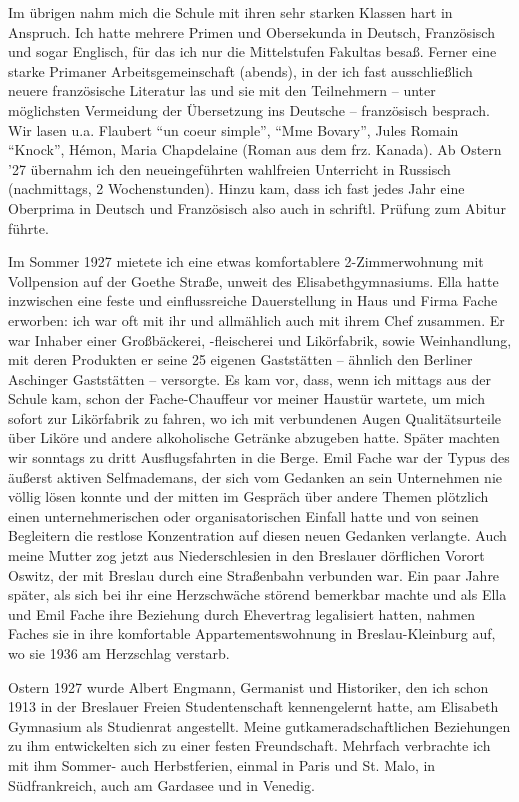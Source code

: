 Im übrigen nahm mich die Schule mit ihren sehr starken Klassen hart in Anspruch. Ich hatte mehrere Primen und Obersekunda in Deutsch, Französisch und sogar Englisch, für das ich nur die Mittelstufen Fakultas besaß. Ferner eine starke Primaner Arbeitsgemeinschaft (abends), in der ich fast ausschließlich neuere französische Literatur las und sie mit den Teilnehmern -- unter möglichsten Vermeidung der Übersetzung ins Deutsche -- französisch besprach. Wir lasen u.a. Flaubert \enquote{un coeur simple}, \enquote{Mme Bovary}, Jules Romain \enquote{Knock}, Hémon, Maria Chapdelaine (Roman aus dem frz. Kanada). Ab Ostern '27 übernahm ich den neueingeführten wahlfreien Unterricht in Russisch (nachmittags, 2 Wochenstunden). Hinzu kam, dass ich fast jedes Jahr eine Oberprima in Deutsch und Französisch also auch in schriftl. Prüfung zum Abitur führte.

Im Sommer 1927 mietete ich eine etwas komfortablere 2-Zimmerwohnung mit Vollpension auf der Goethe Straße, unweit des Elisabethgymnasiums. Ella hatte inzwischen eine feste und einflussreiche Dauerstellung in Haus und Firma Fache erworben: ich war oft mit ihr und allmählich auch mit ihrem Chef zusammen. Er war Inhaber einer Großbäckerei, -fleischerei und Likörfabrik, sowie Weinhandlung, mit deren Produkten er seine 25 eigenen Gaststätten -- ähnlich den Berliner Aschinger Gaststätten -- versorgte. Es kam vor, dass, wenn ich mittags aus der Schule kam, schon der Fache-Chauffeur vor meiner Haustür wartete, um mich sofort zur Likörfabrik zu fahren, wo ich mit verbundenen Augen Qualitätsurteile über Liköre und andere alkoholische Getränke abzugeben hatte. Später machten wir sonntags zu dritt Ausflugsfahrten in die Berge. Emil Fache war der Typus des äußerst aktiven Selfmademans, der sich vom Gedanken an sein Unternehmen nie völlig lösen konnte und der mitten im Gespräch über andere Themen plötzlich einen unternehmerischen oder organisatorischen Einfall hatte und von seinen Begleitern die restlose Konzentration auf diesen neuen Gedanken verlangte. Auch meine Mutter zog jetzt aus Niederschlesien in den Breslauer dörflichen Vorort Oswitz, der mit Breslau durch eine Straßenbahn verbunden war. Ein paar Jahre später, als sich bei ihr eine Herzschwäche störend bemerkbar machte und als Ella und Emil Fache ihre Beziehung durch Ehevertrag legalisiert hatten, nahmen Faches sie in ihre komfortable Appartementswohnung in Breslau-Kleinburg auf, wo sie 1936 am Herzschlag verstarb.

Ostern 1927 wurde Albert Engmann, Germanist und Historiker, den ich schon 1913 in der Breslauer Freien Studentenschaft kennengelernt hatte, am Elisabeth Gymnasium als Studienrat angestellt. Meine gutkameradschaftlichen Beziehungen zu ihm entwickelten sich zu einer festen Freundschaft. Mehrfach verbrachte ich mit ihm Sommer- auch Herbstferien, einmal in Paris und St. Malo, in Südfrankreich, auch am Gardasee und in Venedig.

